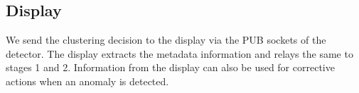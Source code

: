 %
%

\subsection{Display}
\label{subsec:display}
We send the clustering decision to the display via the PUB sockets of the 
detector. The display extracts the metadata information and relays the same to 
stages 1 and 2. Information from the display can also be used for corrective 
actions when an anomaly is detected. 


